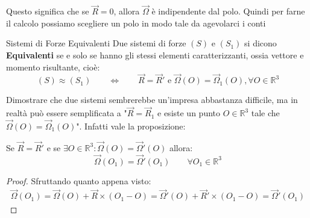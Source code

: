 \documentclass[11pt,a4paper,twoside]{article}
\theoremstyle{definition}
\begin{document}
Questo significa che se $\vec R = 0$, allora $\vec\Omega$ è indipendente dal polo. Quindi per farne il calcolo possiamo scegliere un polo in modo tale da agevolarci i conti

\begin{defn}{Sistemi di Forze Equivalenti}{}
	Due sistemi di forze $(S)$ e $(S_1)$ si dicono \textbf{Equivalenti} se e solo se hanno gli stessi elementi caratterizzanti, ossia vettore e momento risultante, cioè:
	\[ (S)\approx (S_1) \qquad \Leftrightarrow \qquad \vec R=\vec R' \text{ e } \vec \Omega(O) = \vec \Omega_1(O), \forall O \in \mathbb R^3\]
\end{defn}

Dimostrare che due sistemi sembrerebbe un'impresa abbastanza difficile, ma in realtà può essere semplificata a "$\vec R = \vec R_1$ e esiste un punto $O \in \mathbb R^3$ tale che $\vec \Omega(O) = \vec \Omega_1(O)$". Infatti vale la proposizione:

\begin{prop}{}{}
	Se $\vec R = \vec R'$ e se $\exists O \in \mathbb R^3: \vec \Omega(O) = \vec \Omega'(O)$ allora:
	\[ \vec \Omega(O_1) = \vec \Omega'(O_1)\qquad \forall O_1 \in \mathbb R^3 \]
\end{prop}

\begin{proof}
	Sfruttando quanto appena visto:
	\begin{align*}
		\vec \Omega(O_1) = \vec \Omega(O) + \vec R \times (O_1-O) = \vec \Omega'(O) + \vec R' \times(O_1-O) = \vec \Omega'(O_1)
	\end{align*}
\end{proof}
\end{document}
